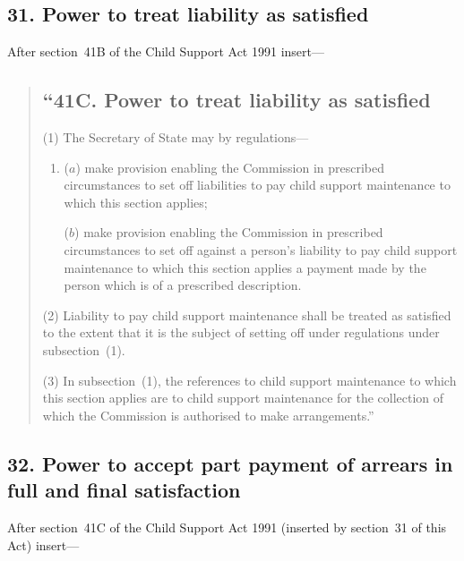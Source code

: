 \documentclass[12pt,a4paper]{article}
\begin{document}
\subsection{31. Power to treat liability as satisfied}

After section~41B of the Child Support Act 1991 insert---
\begin{quotation}
\subsection*{``41C. Power to treat liability as satisfied}

(1) The Secretary of State may by regulations---
\begin{enumerate}\item[]
($a$) make provision enabling the Commission in prescribed circumstances to set off liabilities to pay child support maintenance to which this section applies;

($b$) make provision enabling the Commission in prescribed circumstances to set off against a person’s liability to pay child support maintenance to which this section applies a payment made by the person which is of a prescribed description.
\end{enumerate}

(2)
Liability to pay child support maintenance shall be treated as satisfied to the extent that it is the subject of setting off under regulations under subsection~(1).

(3)
In subsection~(1), the references to child support maintenance to which this section applies are to child support maintenance for the collection of which the Commission is authorised to make arrangements.''
\end{quotation}

\subsection{32. Power to accept part payment of arrears in full and final satisfaction}

After section~41C of the Child Support Act 1991 (inserted by section~31 of this Act) insert---
\end{document}
